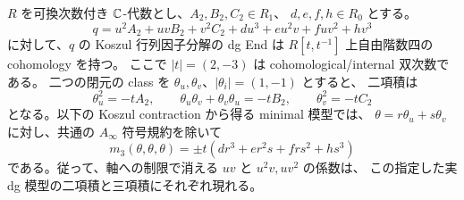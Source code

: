 \begin{lemma}
\label{tcr:lem:mixed-normal-products}
$R$ を可換次数付き $\mathbb C$-代数とし、$A_2,B_2,C_2\in R_1$、
$d,e,f,h\in R_0$ とする。
\begin{equation}\label{tcr:eq:normal-potential}
 q=u^2A_2+uvB_2+v^2C_2+du^3+eu^2v+fuv^2+hv^3
\end{equation}
に対して、$q$ の Koszul 行列因子分解の dg End は
$R[t,t^{-1}]$ 上自由階数四の cohomology を持つ。
ここで $|t|=(2,-3)$ は cohomological/internal 双次数である。
二つの閉元の class を $\theta_u,\theta_v$、$|\theta_i|=(1,-1)$ とすると、
二項積は
\begin{equation}\label{tcr:eq:normal-clifford}
 \theta_u^2=-tA_2,\qquad
 \theta_u\theta_v+\theta_v\theta_u=-tB_2,\qquad
 \theta_v^2=-tC_2
\end{equation}
となる。以下の Koszul contraction から得る minimal 模型では、
$\theta=r\theta_u+s\theta_v$ に対し、共通の $A_\infty$ 符号規約を除いて
\begin{equation}\label{tcr:eq:normal-cubic}
       m_3(\theta,\theta,\theta)
              =\pm t(dr^3+er^2s+frs^2+hs^3)
\end{equation}
である。従って、軸への制限で消える $uv$ と $u^2v,uv^2$ の係数は、
この指定した実 dg 模型の二項積と三項積にそれぞれ現れる。
\end{lemma}

